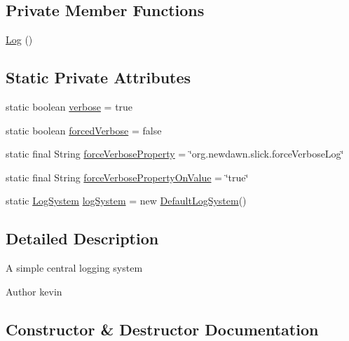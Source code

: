 \subsection*{Private Member Functions}
\begin{DoxyCompactItemize}
\item 
\mbox{\hyperlink{classorg_1_1newdawn_1_1slick_1_1util_1_1_log_a12b5743a88444ce86c46aa807fd0d0e9}{Log}} ()
\end{DoxyCompactItemize}
\subsection*{Static Private Attributes}
\begin{DoxyCompactItemize}
\item 
static boolean \mbox{\hyperlink{classorg_1_1newdawn_1_1slick_1_1util_1_1_log_af438e0ccf09b79bc870bd66fb9a02150}{verbose}} = true
\item 
static boolean \mbox{\hyperlink{classorg_1_1newdawn_1_1slick_1_1util_1_1_log_ac5c775f540d68914085b57d8ac1868f8}{forced\+Verbose}} = false
\item 
static final String \mbox{\hyperlink{classorg_1_1newdawn_1_1slick_1_1util_1_1_log_a8beda0caa3ca5e7c2e548ed75441651e}{force\+Verbose\+Property}} = \char`\"{}org.\+newdawn.\+slick.\+force\+Verbose\+Log\char`\"{}
\item 
static final String \mbox{\hyperlink{classorg_1_1newdawn_1_1slick_1_1util_1_1_log_ad68d2c98c3de4a4b3ce34bc5e195cc9a}{force\+Verbose\+Property\+On\+Value}} = \char`\"{}true\char`\"{}
\item 
static \mbox{\hyperlink{interfaceorg_1_1newdawn_1_1slick_1_1util_1_1_log_system}{Log\+System}} \mbox{\hyperlink{classorg_1_1newdawn_1_1slick_1_1util_1_1_log_acca32268a2a183e671051b4b9188cc72}{log\+System}} = new \mbox{\hyperlink{classorg_1_1newdawn_1_1slick_1_1util_1_1_default_log_system}{Default\+Log\+System}}()
\end{DoxyCompactItemize}


\subsection{Detailed Description}
A simple central logging system

\begin{DoxyAuthor}{Author}
kevin 
\end{DoxyAuthor}


\subsection{Constructor \& Destructor Documentation}
\mbox{\label{classorg_1_1newdawn_1_1slick_1_1util_1_1_log_a12b5743a88444ce86c46aa807fd0d0e9}} 
